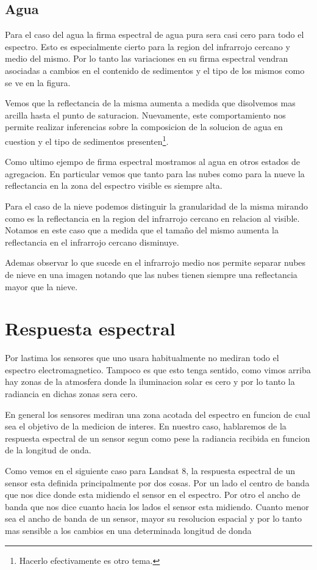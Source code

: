 \subsection{Agua}
Para el caso del agua la firma espectral de agua pura sera casi cero para todo
el espectro. Esto es especialmente cierto para la region del infrarrojo cercano
y medio del mismo. Por lo tanto las variaciones en su firma espectral vendran
asociadas a cambios en el contenido de sedimentos y el tipo de los mismos como
se ve en la figura.

Vemos que la reflectancia de la misma aumenta a medida que disolvemos mas
arcilla hasta el punto de saturacion. Nuevamente, este comportamiento nos
permite realizar inferencias sobre la composicion de la solucion de agua en
cuestion y el tipo de sedimentos presenten\footnote{Hacerlo efectivamente es
otro tema.}.

Como ultimo ejempo de firma espectral mostramos al agua en otros estados de
agregacion. En particular vemos que tanto para las nubes como para la nueve la
reflectancia en la zona del espectro visible es siempre alta.

Para el caso de la nieve podemos distinguir la granularidad de la misma mirando
como es la reflectancia en la region del infrarrojo cercano en relacion al
visible. Notamos en este caso que a medida que el tamaño del mismo aumenta la
reflectancia en el infrarrojo cercano disminuye.

Ademas observar lo que sucede en el infrarrojo medio nos permite separar nubes
de nieve en una imagen notando que las nubes tienen siempre una reflectancia
mayor que la nieve.

\section{Respuesta espectral}

Por lastima los sensores que uno usara habitualmente no mediran todo el espectro
electromagnetico. Tampoco es que esto tenga sentido, como vimos arriba hay zonas
de la atmosfera donde la iluminacion solar es cero y por lo tanto la radiancia
en dichas zonas sera cero.

En general los sensores mediran una zona acotada del espectro en funcion de cual
sea el objetivo de la medicion de interes. En nuestro caso, hablaremos de la
respuesta espectral de un sensor segun como pese la radiancia recibida en
funcion de la longitud de onda.

Como vemos en el siguiente caso para Landsat 8, la respuesta espectral de un
sensor esta definida principalmente por dos cosas. Por un lado el centro de
banda que nos dice donde esta midiendo el sensor en el espectro. Por otro el
ancho de banda que nos dice cuanto hacia los lados el sensor esta midiendo.
Cuanto menor sea el ancho de banda de un sensor, mayor su resolucion espacial y
por lo tanto mas sensible a los cambios en una determinada longitud de donda

